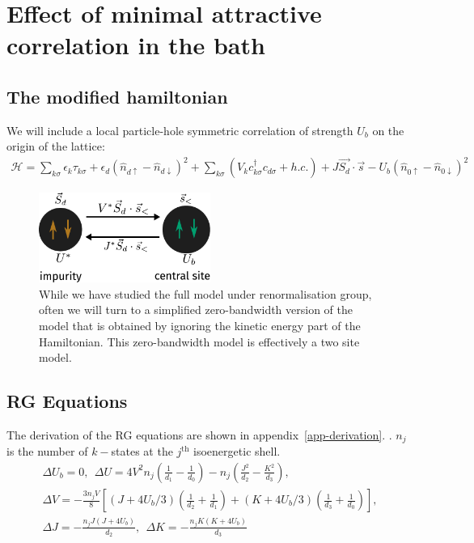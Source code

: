 \chapter{Effect of minimal attractive correlation in the bath}
\label{siam-attr-chap}

\section{The modified hamiltonian}
We will include a local particle-hole symmetric correlation of strength \(U_b\) on the origin of the lattice:
\begin{equation}\begin{aligned}
	\mathcal{H} = \sum_{k\sigma}\epsilon_k \tau_{k\sigma} + \epsilon_d \left( \hat n_{d \uparrow} - \hat n_{d \downarrow} \right) ^2 + \sum_{k\sigma} \left(V_{k} c^\dagger_{k\sigma} c_{d\sigma} + h.c.\right) +J \vec{S_d}\cdot\vec{s} - U_b\left(\hat n_{0 \uparrow} - \hat n_{0 \downarrow}\right)^2 
\end{aligned}\end{equation}

\begin{figure}[!htb]
	\centering
	\includegraphics[width=0.5\textwidth]{../figures/zeromode.pdf}
	\caption{While we have studied the full model under renormalisation group, often we will turn to a simplified zero-bandwidth version of the model that is obtained by ignoring the kinetic energy part of the Hamiltonian. This zero-bandwidth model is effectively a two site model.}
\end{figure}

\section{RG Equations}

The derivation of the RG equations are shown in appendix~\ref{app-derivation}.
. \(n_j\) is the number of \(k-\)states at the \(j^\text{th}\) isoenergetic shell. 
\begin{gather}
	\Delta U_b = 0, ~ ~\Delta U = 4V^2 n_j\left(\frac{1}{d_1} - \frac{1}{d_0}\right) - n_j\left(\frac{J^2}{d_2} - \frac{K^2}{d_3}\right),\label{rg-eq1}\\
	\Delta V = -\frac{3n_j V}{8}\left[\left(J + 4U_b/3\right) \left(\frac{1}{d_2} + \frac{1}{d_1}\right) + \left(K + 4U_b/3\right)\left(\frac{1}{d_3} + \frac{1}{d_0}\right)\right],\label{rg-eq2}\\
	\Delta J = -\frac{n_j J\left(J + 4U_b\right)}{d_2},~ ~\Delta K = -\frac{n_j K\left(K + 4U_b\right)}{d_3}\label{rg-eq3}
\end{gather}

